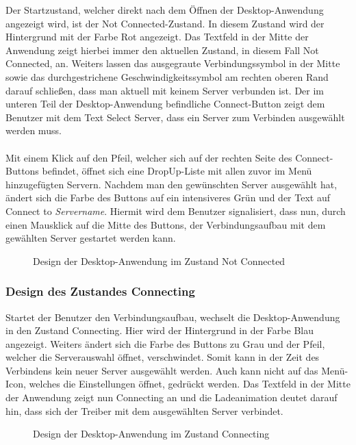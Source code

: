 Der Startzustand, welcher direkt nach dem Öffnen der Desktop-Anwendung angezeigt wird, ist der Not Connected-Zustand. In diesem Zustand wird der Hintergrund mit der Farbe Rot angezeigt. Das Textfeld in der Mitte der Anwendung zeigt hierbei immer den aktuellen Zustand, in diesem Fall Not Connected, an. Weiters lassen das ausgegraute Verbindungssymbol in der Mitte sowie das durchgestrichene Geschwindigkeitssymbol am rechten oberen Rand darauf schließen, dass man aktuell mit keinem Server verbunden ist. Der im unteren Teil der Desktop-Anwendung befindliche Connect-Button zeigt dem Benutzer mit dem Text Select Server, dass ein Server zum Verbinden ausgewählt werden muss.
\\ \ \\
Mit einem Klick auf den Pfeil, welcher sich auf der rechten Seite des Connect-Buttons befindet, öffnet sich eine DropUp-Liste mit allen zuvor im Menü hinzugefügten Servern. Nachdem man den gewünschten Server ausgewählt hat, ändert sich die Farbe des Buttons auf ein intensiveres Grün und der Text auf Connect to \textit{Servername}. Hiermit wird dem Benutzer signalisiert, dass nun, durch einen Mausklick auf die Mitte des Buttons, der Verbindungsaufbau mit dem gewählten Server gestartet werden kann.
\\
\begin{figure}[H]
    \centering
    \setlength{\fboxsep}{1pt}
	\setlength{\fboxrule}{1pt}
    \caption{Design der Desktop-Anwendung im Zustand Not Connected} 
\end{figure}

\pagebreak

\subsubsection{Design des Zustandes Connecting}

Startet der Benutzer den Verbindungsaufbau, wechselt die Desktop-Anwendung in den Zustand Connecting. Hier wird der Hintergrund in der Farbe Blau angezeigt. Weiters ändert sich die Farbe des Buttons zu Grau und der Pfeil, welcher die Serverauswahl öffnet, verschwindet. Somit kann in der Zeit des Verbindens kein neuer Server ausgewählt werden. Auch kann nicht auf das Menü-Icon, welches die Einstellungen öffnet, gedrückt werden. Das Textfeld in der Mitte der Anwendung zeigt nun Connecting an und die Ladeanimation deutet darauf hin, dass sich der Treiber mit dem ausgewählten Server verbindet.
\\
\begin{figure}[H]
    \centering
    \setlength{\fboxsep}{1pt}
	\setlength{\fboxrule}{1pt}
    \caption{Design der Desktop-Anwendung im Zustand Connecting} 
\end{figure}


